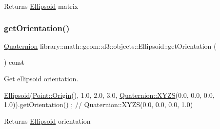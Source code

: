 \begin{DoxyReturn}{Returns}
\hyperlink{classlibrary_1_1math_1_1geom_1_1d3_1_1objects_1_1_ellipsoid}{Ellipsoid} matrix 
\end{DoxyReturn}
\mbox{\label{classlibrary_1_1math_1_1geom_1_1d3_1_1objects_1_1_ellipsoid_a8d426da587827eff577de4edb58ae417}} 
\subsubsection{\texorpdfstring{get\+Orientation()}{getOrientation()}}
{\footnotesize\ttfamily \hyperlink{classlibrary_1_1math_1_1geom_1_1trf_1_1rot_1_1_quaternion}{Quaternion} library\+::math\+::geom\+::d3\+::objects\+::\+Ellipsoid\+::get\+Orientation (\begin{DoxyParamCaption}{ }\end{DoxyParamCaption}) const}



Get ellipsoid orientation. 


\begin{DoxyCode}
\hyperlink{classlibrary_1_1math_1_1geom_1_1d3_1_1objects_1_1_ellipsoid_aae81fe0edc7f0e8d4590ea89ae73cb14}{Ellipsoid}(\hyperlink{classlibrary_1_1math_1_1geom_1_1d3_1_1objects_1_1_point_ab2a38e285c562e50bf350272c083986f}{Point::Origin}(), 1.0, 2.0, 3.0, \hyperlink{classlibrary_1_1math_1_1geom_1_1trf_1_1rot_1_1_quaternion_afff9523c7dcbfbbc521736121e62ad41}{Quaternion::XYZS}(0.0, 0.0, 
      0.0, 1.0)).getOrientation() ; \textcolor{comment}{// Quaternion::XYZS(0.0, 0.0, 0.0, 1.0)}
\end{DoxyCode}


\begin{DoxyReturn}{Returns}
\hyperlink{classlibrary_1_1math_1_1geom_1_1d3_1_1objects_1_1_ellipsoid}{Ellipsoid} orientation 
\end{DoxyReturn}
\mbox{\label{classlibrary_1_1math_1_1geom_1_1d3_1_1objects_1_1_ellipsoid_a33dde96894c213da77ee116ff18fdf86}} 
